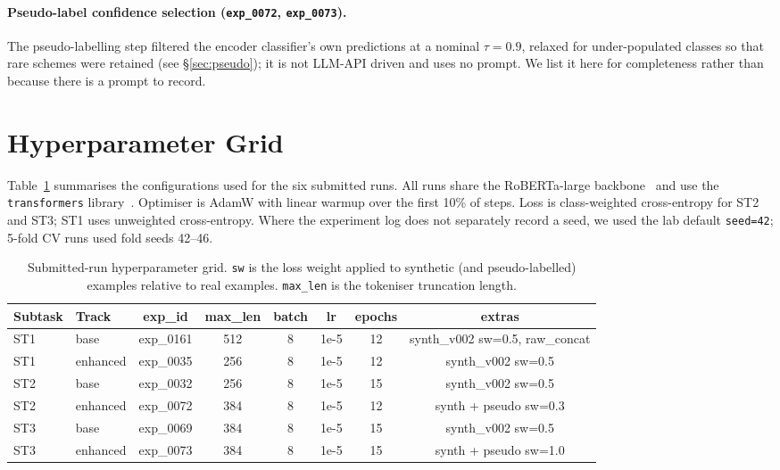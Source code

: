 \documentclass{ceurart}
\begin{document}
\paragraph{Pseudo-label confidence selection (\texttt{exp\_0072},
\texttt{exp\_0073}).}
The pseudo-labelling step filtered the encoder classifier's own
predictions at a nominal $\tau=0.9$, relaxed for under-populated classes
so that rare schemes were retained (see \S\ref{sec:pseudo}); it is not LLM-API
driven and uses no prompt. We list it here for completeness rather
than because there is a prompt to record.

\section{Hyperparameter Grid}
\label{app:hyper}

Table~\ref{tab:hyper} summarises the configurations used for the six submitted runs.
All runs share the RoBERTa-large backbone~\cite{liu2019roberta} and use the
\texttt{transformers} library~\cite{wolf2020transformers}. Optimiser is AdamW with
linear warmup over the first 10\% of steps. Loss is class-weighted cross-entropy for ST2 and ST3;
ST1 uses unweighted cross-entropy. Where the experiment log does not separately record a seed,
we used the lab default \texttt{seed=42}; 5-fold CV runs used fold seeds 42--46.

\begin{table}[h]
\centering
\small
\caption{Submitted-run hyperparameter grid. \texttt{sw} is the loss weight applied to
synthetic (and pseudo-labelled) examples relative to real examples. \texttt{max\_len}
is the tokeniser truncation length.}
\label{tab:hyper}
\begin{tabular}{llcccccc}
\toprule
Subtask & Track & exp\_id & max\_len & batch & lr & epochs & extras \\
\midrule
ST1 & base     & exp\_0161 & 512 & 8 & 1e-5 & 12 & synth\_v002 sw=0.5, raw\_concat \\ %
ST1 & enhanced & exp\_0035 & 256 & 8 & 1e-5 & 12 & synth\_v002 sw=0.5 \\ %
ST2 & base     & exp\_0032 & 256 & 8 & 1e-5 & 15 & synth\_v002 sw=0.5 \\ %
ST2 & enhanced & exp\_0072 & 384 & 8 & 1e-5 & 12 & synth + pseudo sw=0.3 \\ %
ST3 & base     & exp\_0069 & 384 & 8 & 1e-5 & 15 & synth\_v002 sw=0.5 \\ %
ST3 & enhanced & exp\_0073 & 384 & 8 & 1e-5 & 15 & synth + pseudo sw=1.0 \\ %
\bottomrule
\end{tabular}
\end{table}
\end{document}
